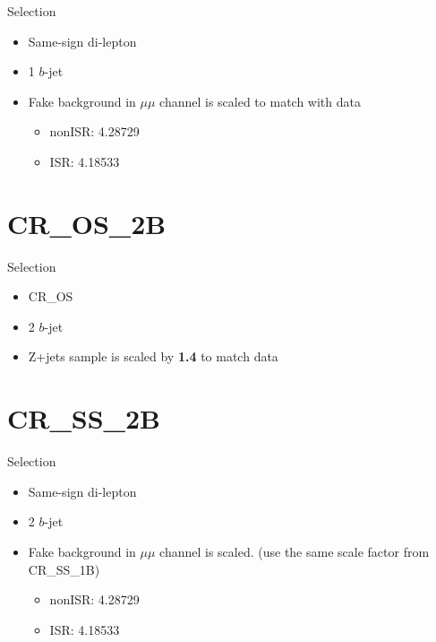 \documentclass[mathserif,serif]{beamer}
\begin{document}
\begin{frame}{Selection}
\begin{itemize}
\item Same-sign di-lepton
\item 1 $b$-jet
\item Fake background in $\mu\mu$ channel is scaled to match with data
\begin{itemize}
\item nonISR: 4.28729
\item ISR: 4.18533
\end{itemize}
\end{itemize}
\end{frame}

%
%

\section{CR\_OS\_2B}
\begin{frame}
\sectionpage
\end{frame}

\begin{frame}{Selection}
\begin{itemize}
\item CR\_OS
\item 2 $b$-jet
\item Z+jets sample is scaled by {\bf 1.4} to match data
\end{itemize}
\end{frame}
%
%

\section{CR\_SS\_2B}
\begin{frame}
\sectionpage
\end{frame}

\begin{frame}{Selection}
\begin{itemize}
\item Same-sign di-lepton
\item 2 $b$-jet
\item Fake background in $\mu\mu$ channel is scaled. (use the same scale factor from CR\_SS\_1B)
\begin{itemize}
\item nonISR: 4.28729
\item ISR: 4.18533
\end{itemize}
\end{itemize}
\end{frame}
\end{document}
